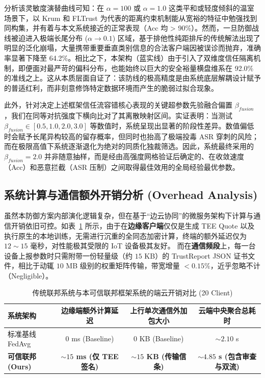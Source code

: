 \documentclass[11pt, a4paper, UTF8, fontset=fandol]{ctexart}
\begin{document}
分析该灵敏度演替曲线可知：在 $\alpha=100$ 或 $\alpha=1.0$ 这类平和或轻度倾斜的温室场景下，以 Krum 和 FLTrust 为代表的距离约束机制能从宽裕的特征中勉强找到同构集，并有着与本文系统接近的正常表现（Acc 均 > 90\%）。然而，一旦防御战线被迫进入极端长尾分布 ($\alpha \to 0.1$) 区域，基于排他性纯距排斥的传统解法出现了明显的泛化崩塌，大量携带重要垂直类别信息的合法客户端因被误诊而抛弃，准确率显著下降至 64.2\%。相比之下，本架构（蓝实线）由于引入了双维度信任隔离机制，即便面对最严苛的偏科分布，也能始终以巨大的安全裕量横盘维系在 92.0\% 的准线之上。这从本质层面自证了：该防线的极高精度是由系统底层解耦设计赋予的普适红利，而非刻意修饰特定数据环境而产生的脆弱过拟合现象。

此外，针对决定上述框架信任流容错核心表现的关键超参数先验融合偏置 $\beta_{fusion}$，我们在同等对抗强度下横向比对了其离散映射区间。实证表明：当测试 $\beta_{fusion} \in [0.5, 1.0, 2.0, 3.0]$ 等数值时，系统呈现出显著的阶段性差异。数值偏低时会赋予长尾异构较高的留存概率，但同时也抬高了极端投毒 ASR 穿刺的风险；而在极限高值下系统逐渐退化为绝对的同质化独裁筛选。因此，系统最终采用的 $\beta_{fusion} = 2.0$ 并非随意抽样，而是经由高强度网格验证后确定的、在收敛速度（Acc）和恶意拦截（ASR 压制）之间取得最佳效用的全局经验最优参数。

\subsection{系统计算与通信额外开销分析 (Overhead Analysis)}
虽然本防御方案内部演化逻辑复杂，但在基于“边云协同”的微服务架构下计算与通信开销依旧可控。如表~\ref{tab:overhead} 所示，由于在\textbf{边缘客户端}仅仅是生成 TEE Quote 以及执行原生的本地训练，无需进行沉重的全同态加密计算，终端的额外延迟仅为 $12 \sim 15$ 毫秒，对性能极其受限的 IoT 设备极其友好。
而在\textbf{通信频段}上，每一台设备上报参数时只需附带一份轻量级（约 $15$ KB）的 TrustReport JSON 证书文件，相比于动辄 $10$ MB 级别的权重矩阵传输，带宽增量 $<0.15\%$，近乎忽略不计（Negligible）。

\begin{table}[htbp]
\centering
\caption{传统联邦系统与本可信联邦框架系统的端云开销对比 (20 Client)}
\vspace{4pt}
\label{tab:overhead}
\begin{tabular}{l c c c}
\toprule
\textbf{系统架构} & \textbf{边缘端额外计算延迟} & \textbf{上行单次通信外加包大小} & \textbf{云端中央聚合总耗时} \\
\midrule
标准基线 FedAvg & 0 ms (Baseline) & 0 KB (Baseline) & $\sim 2.10$ s \\
\textbf{可信联邦 (Ours)} & \textbf{$\sim 15$ ms (仅 TEE 签名)} & \textbf{$\sim 15$ KB (传输信条)} & \textbf{$\sim 4.85$ s (包含审查与双流)} \\
\bottomrule
\end{tabular}
\end{table}
\end{document}
